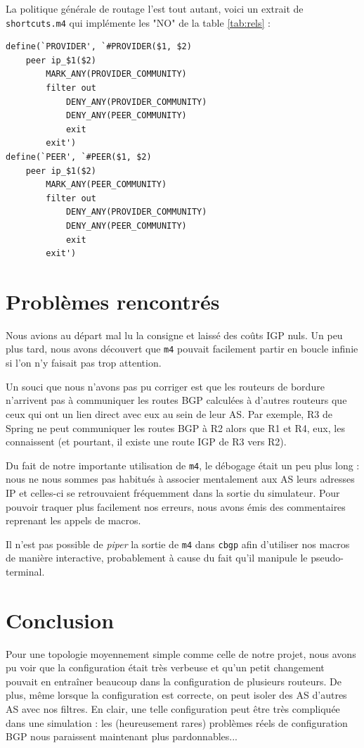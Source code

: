 \documentclass[10pt,a4paper,twocolumn]{article}
\begin{document}
La politique générale de routage l'est tout autant, voici un extrait de \texttt{shortcuts.m4} qui implémente les "NO" de la table \ref{tab:rels} :
\begin{verbatim}
define(`PROVIDER', `#PROVIDER($1, $2)
    peer ip_$1($2)
        MARK_ANY(PROVIDER_COMMUNITY)
        filter out
            DENY_ANY(PROVIDER_COMMUNITY)
            DENY_ANY(PEER_COMMUNITY)
            exit
        exit')
define(`PEER', `#PEER($1, $2)
    peer ip_$1($2)
        MARK_ANY(PEER_COMMUNITY)
        filter out
            DENY_ANY(PROVIDER_COMMUNITY)
            DENY_ANY(PEER_COMMUNITY)
            exit
        exit')
\end{verbatim}

\section{Problèmes rencontrés}
Nous avions au départ mal lu la consigne et laissé des coûts IGP nuls. Un peu plus tard, nous avons découvert que \texttt{m4} pouvait facilement partir en boucle infinie si l'on n'y faisait pas trop attention.

Un souci que nous n'avons pas pu corriger est que les routeurs de bordure n'arrivent pas à communiquer les routes BGP calculées à d'autres routeurs que ceux qui ont un lien direct avec eux au sein de leur AS.
Par exemple, R3 de Spring ne peut communiquer les routes BGP à R2 alors que R1 et R4, eux, les connaissent (et pourtant, il existe une route IGP de R3 vers R2).

Du fait de notre importante utilisation de \texttt{m4}, le débogage était un peu plus long : nous ne nous sommes pas habitués à associer mentalement aux AS leurs adresses IP et celles-ci se retrouvaient fréquemment dans la sortie du simulateur. Pour pouvoir traquer plus facilement nos erreurs, nous avons émis des commentaires reprenant les appels de macros.

Il n'est pas possible de \textit{piper} la sortie de \texttt{m4} dans \texttt{cbgp} afin d'utiliser nos macros de manière interactive, probablement à cause du fait qu'il manipule le pseudo-terminal.

\section{Conclusion}
Pour une topologie moyennement simple comme celle de notre projet, nous avons pu voir que la configuration était très verbeuse et qu'un petit changement pouvait en entraîner beaucoup dans la configuration de plusieurs routeurs. De plus,
même lorsque la configuration est correcte, on peut isoler des AS d'autres AS avec nos filtres.
En clair, une telle configuration peut être très compliquée dans une simulation : les (heureusement rares) problèmes réels de configuration BGP nous paraissent maintenant plus pardonnables...
\end{document}
